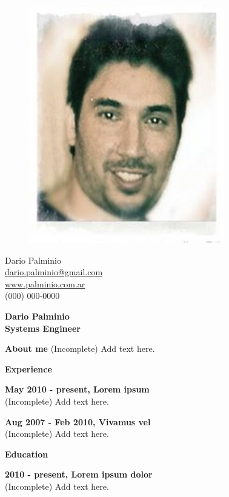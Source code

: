 \documentclass[a4paper,12pt,final]{memoir}
\newcommand{\Sep}{\vspace{1.5em}}
\newcommand{\SmallSep}{\vspace{0.5em}}
\newenvironment{AboutMe}
	{\ignorespaces\textbf{\color{RoyalBlue} About me}}
	{\Sep\ignorespacesafterend}
\newcommand{\CVSection}[1]
	{\Large\textbf{#1}\par
	\SmallSep\normalsize\normalfont}
\newcommand{\CVItem}[1]
	{\textbf{\color{RoyalBlue} #1}}
\begin{document}
\begin{figure}
	\hfill
	\includegraphics[width=0.6\columnwidth]{photo}
	\vspace{-7cm}
\end{figure}

\begin{flushright}\small
	Dario Palminio \\
	\url{dario.palminio@gmail.com}  \\
	\url{www.palminio.com.ar} \\
	(000) 000-0000
\end{flushright}\normalsize
\framebreak


\Huge\bfseries {\color{RoyalBlue} Dario Palminio} \\
\Large\bfseries  Systems Engineer \\

\normalsize\normalfont

\begin{AboutMe}
(Incomplete) Add text here.
\end{AboutMe}

\CVSection{Experience}
\CVItem{May 2010 - present, Lorem ipsum}\\
(Incomplete) Add text here.
\SmallSep

\CVItem{Aug 2007 - Feb 2010, Vivamus vel}\\
(Incomplete) Add text here.
\Sep

\CVSection{Education}
\CVItem{2010 - present, Lorem ipsum dolor}\\
(Incomplete) Add text here.
\SmallSep
\end{document}
